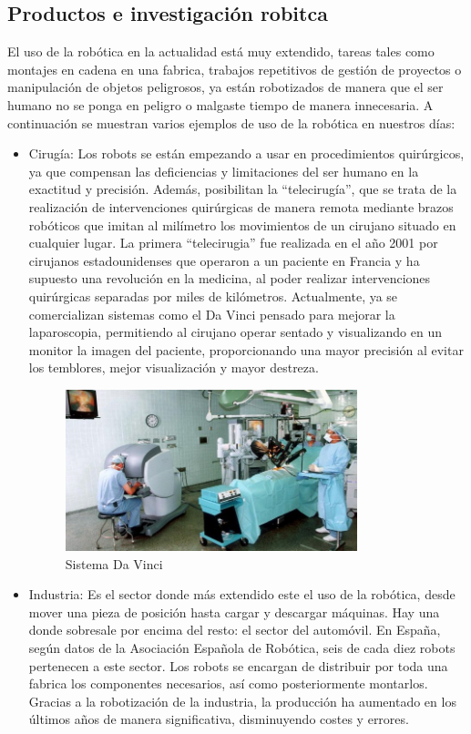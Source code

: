 \subsection{Productos e investigación robitca}
El uso de la robótica en la actualidad está muy extendido, tareas tales como montajes en cadena en una fabrica, trabajos repetitivos de gestión de proyectos o manipulación de objetos peligrosos, ya están robotizados de manera que el ser humano no se ponga en peligro o malgaste tiempo de manera innecesaria. A continuación se muestran varios ejemplos de uso de la robótica en nuestros días:
\begin{itemize}
\item Cirugía: Los robots se están empezando a usar en procedimientos quirúrgicos, ya que compensan las deficiencias y limitaciones del ser humano en la exactitud y precisión. Además, posibilitan la ``telecirugía'', que se trata de la realización de intervenciones quirúrgicas de manera remota mediante brazos robóticos que imitan al milímetro los movimientos de un cirujano situado en cualquier lugar. La primera ``telecirugia'' fue realizada en el año 2001 por cirujanos estadounidenses que operaron a un paciente en Francia y ha supuesto una revolución en la medicina, al poder realizar intervenciones quirúrgicas separadas por miles de kilómetros. Actualmente, ya se comercializan sistemas como el Da Vinci pensado para mejorar la laparoscopia, permitiendo al cirujano operar sentado y visualizando en un monitor la imagen del paciente, proporcionando una mayor precisión al evitar los temblores, mejor visualización y mayor destreza.
\begin{figure}[H]
  \begin{center}
    \includegraphics[width=0.8\textwidth]{figures/sistemadavinci.jpg}
		\caption{Sistema Da Vinci}
		\label{fig.sistemadavinci}
		\end{center}
\end{figure}
\item Industria: Es el sector donde más extendido este el uso de la robótica, desde mover una pieza de posición hasta cargar y descargar máquinas. Hay una donde sobresale por encima del resto: el sector del automóvil. En España, según datos de la Asociación Española de Robótica, seis de cada diez robots pertenecen a este sector. Los robots se encargan de distribuir por toda una fabrica los componentes necesarios, así como posteriormente montarlos. Gracias a la robotización de la industria, la producción ha aumentado en los últimos años de manera significativa, disminuyendo costes y errores.

\end{itemize}
